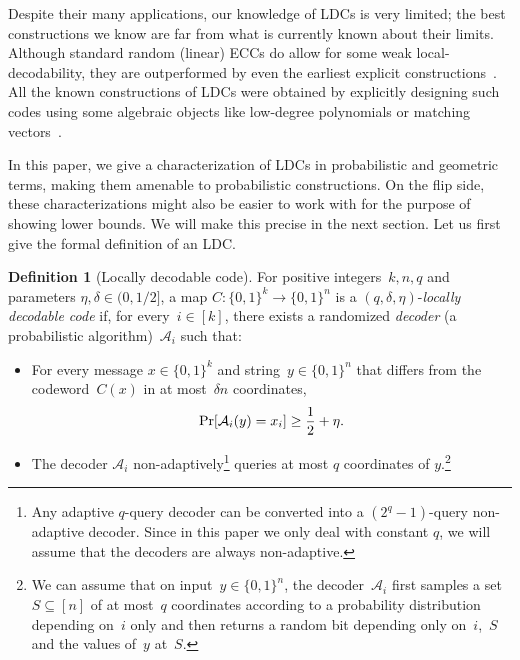 \documentclass[11pt]{article}
\numberwithin{equation}{section}
\theoremstyle{definition}
\newtheorem{definition}[theorem]{Definition}
\theoremstyle{plain}
\newcommand{\bset}[1]{\{0,1\}^{#1}} %
\renewcommand{\Pr}{\mbox{\rm Pr}}
\newcommand{\beq}{\begin{equation}}
\newcommand{\eeq}{\end{equation}}
\begin{document}
Despite their many applications, our knowledge of LDCs is very limited; the best constructions we know are far from what is currently known about their limits.
Although standard random (linear) ECCs do allow for some weak local-decodability, they are outperformed by even the earliest explicit constructions~\cite{KS07}.
All the known constructions of LDCs were obtained by explicitly designing such codes using some algebraic objects like low-degree polynomials or matching vectors~\cite{Yekhanin:2012}. 

In this paper, we give a characterization of LDCs in probabilistic and geometric terms, making them amenable to probabilistic constructions. On the flip side, these characterizations might also be easier to work with for the purpose of showing lower bounds. We will make this precise in the next section.
Let us first give the formal definition of an LDC.

\begin{definition}[Locally decodable code]\label{ldc:def}
For positive integers~$k, n,q$ and parameters $\eta,\delta\in (0,1/2]$, a map $C: \bset{k}\to\bset{n}$ is a $(q,\delta,\eta)$-\emph{locally decodable code} if, for every~$i\in[k]$, there exists a randomized \emph{decoder} (a probabilistic algorithm)~$\mathcal{A}_i$  such that:
 
\begin{itemize}
\item For every message $x\in\bset{k}$ and string~$y\in\bset{n}$ that differs from the codeword~$C(x)$ in at most~$\delta n$ coordinates,
\beq\label{eq:ldcdec}
\Pr[\mathcal A_i( y) = x_i] \geq \frac{1}{2} + \eta.
\eeq
\item The decoder $\mathcal{A}_i$ non-adaptively\footnote{Any adaptive $q$-query decoder can be converted into a $(2^q-1)$-query non-adaptive decoder. Since in this paper we only deal with constant $q$, we will assume that the decoders are always non-adaptive.} queries at most $q$ coordinates of $y$.\footnote{
We can assume that on input~$y\in\bset{n}$, the decoder~$\mathcal A_i$ first samples a set~$S\subseteq[n]$ of at most~$q$ coordinates according to a probability distribution depending on~$i$ only and then returns a random bit depending only on~$i$,~$S$ and the values of~$y$ at~$S$.
}
\end{itemize}
\end{definition}
\end{document}
